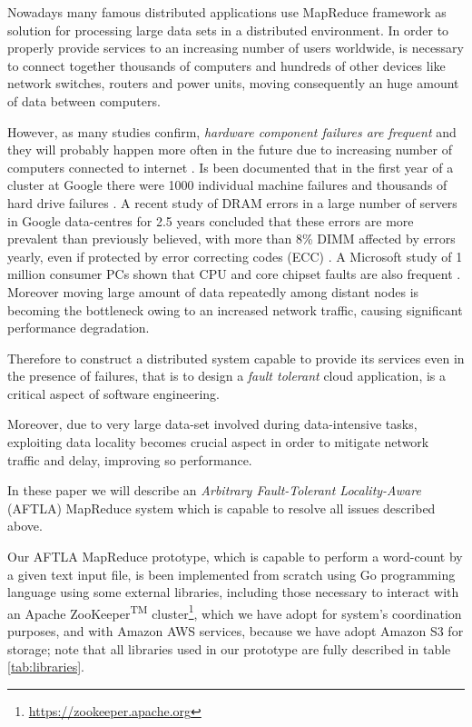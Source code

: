 \documentclass[sigchi]{acmart}
\begin{document}
Nowadays many famous distributed applications use MapReduce framework as solution for processing large data sets in a distributed environment. In order to properly provide services to an increasing number of users worldwide, is necessary to connect together thousands of computers and hundreds of other devices like network switches, routers and power units, moving consequently an huge amount of data between computers. 

However, as many studies confirm, \textit{hardware component failures are frequent} and they will probably happen more often in the future due to increasing number of computers connected to internet \citep{BFLMapReduce}. Is been documented that in the first year of a cluster at Google there were 1000 individual machine failures and thousands of hard drive failures \cite{PetaScaleFailure}. A recent study of DRAM errors in a large number of servers in Google data-centres for 2.5 years concluded that these errors are more prevalent than previously believed, with more than 8\% DIMM affected by errors yearly, even if protected by error correcting codes (ECC) \cite{DRAMError}. A Microsoft study of 1 million consumer PCs shown that CPU and core chipset faults are also frequent \cite{MicrosoftStudyFailure}. Moreover moving large amount of data repeatedly among distant nodes is becoming the bottleneck owing to an increased network traffic, causing significant performance degradation.

Therefore to construct a distributed system capable to provide its services even in the presence of failures, that is to design a \textit{fault tolerant} cloud application, is a critical aspect of software engineering.

Moreover, due to very large data-set involved during data-intensive tasks, exploiting data locality becomes crucial aspect in order to mitigate network traffic and delay, improving so performance.

In these paper we will describe an \textit{Arbitrary Fault-Tolerant Locality-Aware} (AFTLA) MapReduce system which is capable to resolve all issues described above. 

Our AFTLA MapReduce prototype, which is capable to perform a word-count by a given text input file, is been implemented from scratch using Go programming language using some external libraries, including those necessary to interact with an Apache ZooKeeper\textsuperscript{TM} cluster\footnote{\url{https://zookeeper.apache.org}}, which we have adopt for system's coordination purposes, and with Amazon AWS services, because we have adopt Amazon S3 for storage; note that all libraries used in our prototype are fully described in table \ref{tab:libraries}. 
\end{document}
